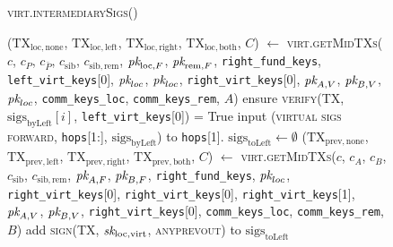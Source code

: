 \begin{figure}[H]
  \begin{processbox}{\textsc{virt.intermediarySigs}()}
    \begin{algorithmic}[1]
      \State ($\mathrm{TX}_{\mathrm{loc}, \mathrm{none}}$,
      $\mathrm{TX}_{\mathrm{loc}, \mathrm{left}}$, $\mathrm{TX}_{\mathrm{loc},
      \mathrm{right}}$, $\mathrm{TX}_{\mathrm{loc}, \mathrm{both}}$, $C$)
      $\gets$ \textsc{virt.getMidTXs}($c$, $c_P$, $c_{\bar{P}}$,
      $c_{\mathrm{sib}}$, $c_{\mathrm{sib}, \mathrm{rem}}$, $\textit{pk}_{\mathrm{loc},
      F}$, $\textit{pk}_{\mathrm{rem}, F}$, \texttt{right\_fund\_keys},
      \texttt{left\_virt\_keys}[0], $\textit{pk}_{loc}$,
      $\textit{pk}_{loc}$, \texttt{right\_virt\_keys}[0], $\textit{pk}_{A, V}$, $\textit{pk}_{B, V}$,
      $\textit{pk}_{loc}$, \texttt{comm\_keys\_loc}, \texttt{comm\_keys\_rem}, $A$)
        \State ensure \textsc{verify}(TX, $\mathrm{sigs}_{\mathrm{byLeft}}[i]$,
        \texttt{left\_virt\_keys}[0]) = True
      \EndFor
      \State input (\textsc{virtual sigs forward}, \texttt{hops}[1:],
      $\mathrm{sigs}_{\mathrm{byLeft}}$) to \texttt{hops}[1].\alice{}
      \State {}
      \State $\mathrm{sigs}_{\mathrm{toLeft}} \gets \emptyset$
       
        \State ($\mathrm{TX}_{\mathrm{prev}, \mathrm{none}}$,
        $\mathrm{TX}_{\mathrm{prev}, \mathrm{left}}$,
        $\mathrm{TX}_{\mathrm{prev}, \mathrm{right}}$,
        $\mathrm{TX}_{\mathrm{prev}, \mathrm{both}}$, $C$) $\gets$
        \textsc{virt.getMidTXs}($c$, $c_A$, $c_B$, $c_{\mathrm{sib}}$,
        $c_{\mathrm{sib}, \mathrm{rem}}$, $\textit{pk}_{A, F}$, $\textit{pk}_{B, F}$,
        \texttt{right\_fund\_keys}, $\textit{pk}_{loc}$, \texttt{right\_virt\_keys}[0],
        \texttt{right\_virt\_keys}[0], \texttt{right\_virt\_keys}[1], $\textit{pk}_{A,
        V}$, $\textit{pk}_{B, V}$, \texttt{right\_virt\_keys}[0],
        \texttt{comm\_keys\_loc}, \texttt{comm\_keys\_rem}, $B$)
          \State add \textsc{sign}(TX, $\textit{sk}_{\mathrm{loc}, \mathrm{virt}}$,
          \textsc{anyprevout}) to $\mathrm{sigs}_{\mathrm{toLeft}}$
        \EndFor
      \Else \: 

\end{algorithmic}
\end{processbox}
\end{figure}

